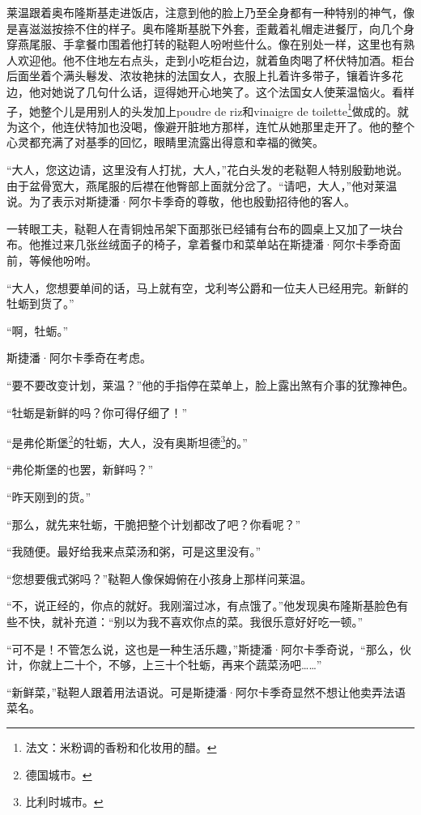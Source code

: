 \par 莱温跟着奥布隆斯基走进饭店，注意到他的脸上乃至全身都有一种特别的神气，像是喜滋滋按捺不住的样子。奥布隆斯基脱下外套，歪戴着礼帽走进餐厅，向几个身穿燕尾服、手拿餐巾围着他打转的鞑靼人吩咐些什么。像在别处一样，这里也有熟人欢迎他。他不住地左右点头，走到小吃柜台边，就着鱼肉喝了杯伏特加酒。柜台后面坐着个满头鬈发、浓妆艳抹的法国女人，衣服上扎着许多带子，镶着许多花边，他对她说了几句什么话，逗得她开心地笑了。这个法国女人使莱温恼火。看样子，她整个儿是用别人的头发加上poudre de riz和vinaigre de toilette\footnote{法文：米粉调的香粉和化妆用的醋。}做成的。就为这个，他连伏特加也没喝，像避开脏地方那样，连忙从她那里走开了。他的整个心灵都充满了对基季的回忆，眼睛里流露出得意和幸福的微笑。
\par “大人，您这边请，这里没有人打扰，大人，”花白头发的老鞑靼人特别殷勤地说。由于盆骨宽大，燕尾服的后襟在他臀部上面就分岔了。“请吧，大人，”他对莱温说。为了表示对斯捷潘·阿尔卡季奇的尊敬，他也殷勤招待他的客人。
\par 一转眼工夫，鞑靼人在青铜烛吊架下面那张已经铺有台布的圆桌上又加了一块台布。他推过来几张丝绒面子的椅子，拿着餐巾和菜单站在斯捷潘·阿尔卡季奇面前，等候他吩咐。
\par “大人，您想要单间的话，马上就有空，戈利岑公爵和一位夫人已经用完。新鲜的牡蛎到货了。”
\par “啊，牡蛎。”
\par 斯捷潘·阿尔卡季奇在考虑。
\par “要不要改变计划，莱温？”他的手指停在菜单上，脸上露出煞有介事的犹豫神色。
\par “牡蛎是新鲜的吗？你可得仔细了！”
\par “是弗伦斯堡\footnote{德国城市。}的牡蛎，大人，没有奥斯坦德\footnote{比利时城市。}的。”
\par “弗伦斯堡的也罢，新鲜吗？”
\par “昨天刚到的货。”
\par “那么，就先来牡蛎，干脆把整个计划都改了吧？你看呢？”
\par “我随便。最好给我来点菜汤和粥，可是这里没有。”
\par “您想要俄式粥吗？”鞑靼人像保姆俯在小孩身上那样问莱温。
\par “不，说正经的，你点的就好。我刚溜过冰，有点饿了。”他发现奥布隆斯基脸色有些不快，就补充道：“别以为我不喜欢你点的菜。我很乐意好好吃一顿。”
\par “可不是！不管怎么说，这也是一种生活乐趣，”斯捷潘·阿尔卡季奇说，“那么，伙计，你就上二十个，不够，上三十个牡蛎，再来个蔬菜汤吧……”
\par “新鲜菜，”鞑靼人跟着用法语说。可是斯捷潘·阿尔卡季奇显然不想让他卖弄法语菜名。
